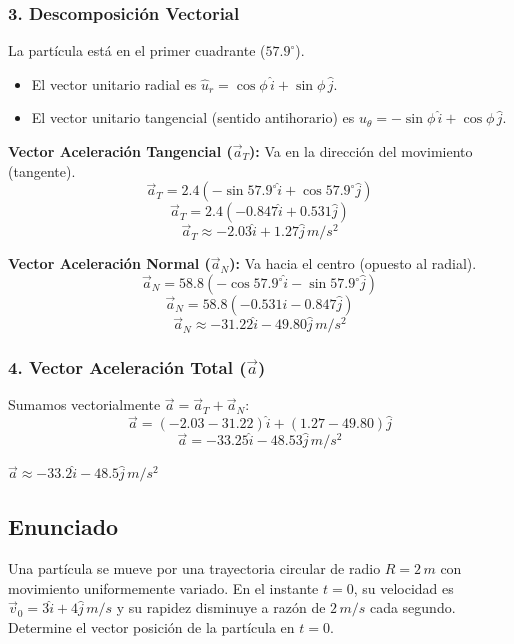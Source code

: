 \documentclass[12pt, a4paper]{article}
\begin{document}
\subsubsection*{3. Descomposición Vectorial}
La partícula está en el primer cuadrante ($57.9^\circ$).
\begin{itemize}
    \item El vector unitario radial es $\hat{u}_r = \cos\phi \, \hat{i} + \sin\phi \, \hat{j}$.
    \item El vector unitario tangencial (sentido antihorario) es $\hat{u}_\theta = -\sin\phi \, \hat{i} + \cos\phi \, \hat{j}$.
\end{itemize}

\textbf{Vector Aceleración Tangencial ($\vec{a}_T$):}
Va en la dirección del movimiento (tangente).
$$ \vec{a}_T = 2.4 (-\sin 57.9^\circ \hat{i} + \cos 57.9^\circ \hat{j}) $$
$$ \vec{a}_T = 2.4 (-0.847 \hat{i} + 0.531 \hat{j}) $$
$$ \vec{a}_T \approx -2.03\hat{i} + 1.27\hat{j} \, \si{m/s^2} $$

\textbf{Vector Aceleración Normal ($\vec{a}_N$):}
Va hacia el centro (opuesto al radial).
$$ \vec{a}_N = 58.8 (-\cos 57.9^\circ \hat{i} - \sin 57.9^\circ \hat{j}) $$
$$ \vec{a}_N = 58.8 (-0.531 \hat{i} - 0.847 \hat{j}) $$
$$ \vec{a}_N \approx -31.22\hat{i} - 49.80\hat{j} \, \si{m/s^2} $$

\subsubsection*{4. Vector Aceleración Total ($\vec{a}$)}
Sumamos vectorialmente $\vec{a} = \vec{a}_T + \vec{a}_N$:
$$ \vec{a} = (-2.03 - 31.22)\hat{i} + (1.27 - 49.80)\hat{j} $$
$$ \vec{a} = -33.25\hat{i} - 48.53\hat{j} \, \si{m/s^2} $$

\begin{tcolorbox}[colback=blue!5!white, colframe=blue!75!black, title=Respuesta Final]
\centering $\vec{a} \approx -33.2\hat{i} - 48.5\hat{j} \, \si{m/s^2}$
\end{tcolorbox}

\newpage

\newpage

\subsection*{Enunciado}
Una partícula se mueve por una trayectoria circular de radio $R = 2 \, \si{m}$ con movimiento uniformemente variado. En el instante $t = 0$, su velocidad es $\vec{v}_0 = 3\hat{i} + 4\hat{j} \, \si{m/s}$ y su rapidez disminuye a razón de $2 \, \si{m/s}$ cada segundo.
Determine el vector posición de la partícula en $t=0$.
\end{document}
